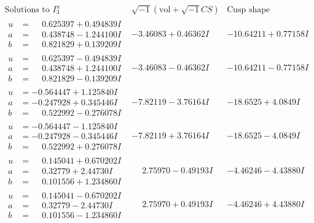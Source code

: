 \documentclass[1p]{elsarticle_modified}
\theoremstyle{definition}
\newcommand{\I}{\sqrt{-1}}
\begin{document}
$$\begin{array}{c|c|c}  
\text{Solutions to }I^u_{3}& \I (\text{vol} + \sqrt{-1}CS) & \text{Cusp shape}\\
 \hline 
\begin{aligned}
u &= \phantom{-}0.625397 + 0.494839 I \\
a &= \phantom{-}0.438748 - 1.244100 I \\
b &= \phantom{-}0.821829 + 0.139209 I\end{aligned}
 & -3.46083 + 0.46362 I & -10.64211 + 0.77158 I \\ \hline\begin{aligned}
u &= \phantom{-}0.625397 - 0.494839 I \\
a &= \phantom{-}0.438748 + 1.244100 I \\
b &= \phantom{-}0.821829 - 0.139209 I\end{aligned}
 & -3.46083 - 0.46362 I & -10.64211 - 0.77158 I \\ \hline\begin{aligned}
u &= -0.564447 + 1.125840 I \\
a &= -0.247928 + 0.345446 I \\
b &= \phantom{-}0.522992 - 0.276078 I\end{aligned}
 & -7.82119 - 3.76164 I & -18.6525 + 4.0849 I \\ \hline\begin{aligned}
u &= -0.564447 - 1.125840 I \\
a &= -0.247928 - 0.345446 I \\
b &= \phantom{-}0.522992 + 0.276078 I\end{aligned}
 & -7.82119 + 3.76164 I & -18.6525 - 4.0849 I \\ \hline\begin{aligned}
u &= \phantom{-}0.145041 + 0.670202 I \\
a &= \phantom{-}0.32779 + 2.44730 I \\
b &= \phantom{-}0.101556 + 1.234860 I\end{aligned}
 & \phantom{-}2.75970 - 0.49193 I & -4.46246 - 4.43880 I \\ \hline\begin{aligned}
u &= \phantom{-}0.145041 - 0.670202 I \\
a &= \phantom{-}0.32779 - 2.44730 I \\
b &= \phantom{-}0.101556 - 1.234860 I\end{aligned}
 & \phantom{-}2.75970 + 0.49193 I & -4.46246 + 4.43880 I \\ \hline\begin{aligned}

\end{aligned}
\end{array}$$
\end{document}
